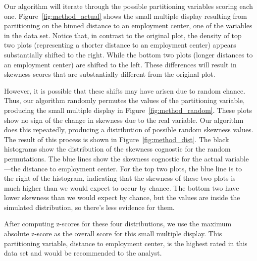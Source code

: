 Our algorithm will iterate through the possible partitioning variables scoring each one. Figure~\ref{fig:method_actual} shows the small multiple display resulting from partitioning on the binned distance to an employment center, one of the variables in the data set. Notice that, in contrast to the original plot, the density of top two plots (representing a shorter distance to an employment center) appears substantially shifted to the right. While the bottom two plots (longer distances to an employment center) are shifted to the left. These differences will result in skewness scores that are substantially different from the original plot. 

However, it is possible that these shifts may have arisen due to random chance. Thus, our algorithm randomly permutes the values of the partitioning variable, producing the small multiple display in Figure~\ref{fig:method_random}. These plots show no sign of the change in skewness due to the real variable. 
Our algorithm does this repeatedly, producing a distribution of possible random skewness values. The result of this process is shown in Figure~\ref{fig:method_dist}. The black histograms show the distribution of the skewness cognostic for the random permutations. The blue lines show the skewness cognostic for the actual variable---the distance to employment center. For the top two plots, the blue line is to the right of the histogram, indicating that the skewness of these two plots is much higher than we would expect to occur by chance. The bottom two have lower skewness than we would expect by chance, but the values are inside the simulated distribution, so there's less evidence for them.

After computing z-scores for these four distributions, we use the maximum absolute z-score as the overall score for this small multiple display. This partitioning variable, distance to employment center, is the highest rated in this data set and would be recommended to the analyst.
